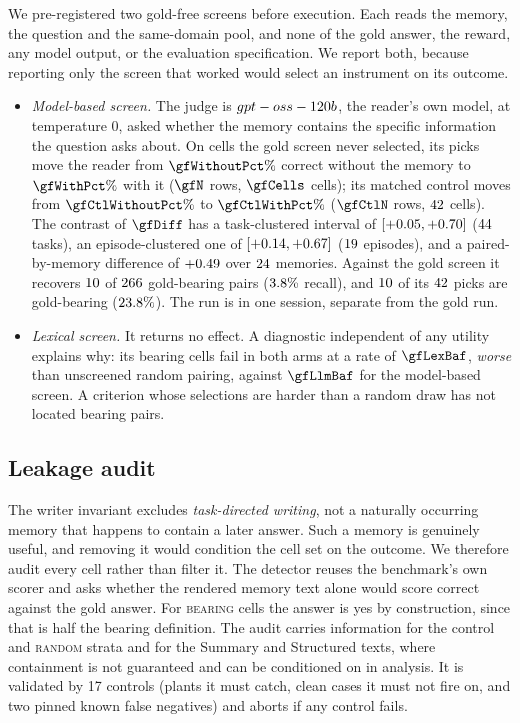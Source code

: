 We pre-registered two gold-free screens before execution. Each reads the
memory, the question and the same-domain pool, and none of the gold answer,
the reward, any model output, or the evaluation specification. We report
both, because reporting only the screen that worked would select an
instrument on its outcome.
\begin{itemize}
\item \emph{Model-based screen.} The judge is $gpt-oss-120b$, the reader's own
model, at temperature 0, asked whether the memory contains the specific
information the question asks about. On cells the gold screen never
selected, its picks move the reader from $\gfWithoutPct\%$ correct without the
memory to $\gfWithPct\%$ with it ($\gfN$ rows, $\gfCells$ cells); its matched
control moves from $\gfCtlWithoutPct\%$ to $\gfCtlWithPct\%$ ($\gfCtlN$ rows,
$42$ cells). The contrast of $\gfDiff$ has a task-clustered interval
of $[+0.05, +0.70]$ ($44$ tasks), an episode-clustered one
of $[+0.14, +0.67]$ ($19$ episodes), and a paired-by-memory
difference of $+0.49$ over $24$ memories. Against the gold screen it
recovers $10$ of $266$ gold-bearing pairs ($3.8\%$ recall),
and $10$ of its $42$ picks are gold-bearing ($23.8\%$). The
run is in one session, separate from the gold run.
\item \emph{Lexical screen.} It returns no effect. A diagnostic independent of
any utility explains why: its bearing cells fail in both arms at a rate of
$\gfLexBaf$, \emph{worse} than unscreened random pairing, against
$\gfLlmBaf$ for the model-based screen. A criterion whose selections are
harder than a random draw has not located bearing pairs.
\end{itemize}

\subsection{Leakage audit}
\label{sec:leakage}
The writer invariant excludes \emph{task-directed writing}, not a naturally
occurring memory that happens to contain a later answer. Such a memory is
genuinely useful, and removing it would condition the cell set on the
outcome. We therefore audit every cell rather than filter it. The detector
reuses the benchmark's own scorer and asks whether the rendered memory text
alone would score correct against the gold answer. For \textsc{bearing} cells
the answer is yes by construction, since that is half the bearing definition.
The audit carries information for the control and \textsc{random} strata and
for the Summary and Structured texts, where containment is not guaranteed and
can be conditioned on in analysis. It is validated by 17
controls (plants it must catch, clean cases it must not fire on, and two
pinned known false negatives) and aborts if any control fails.

